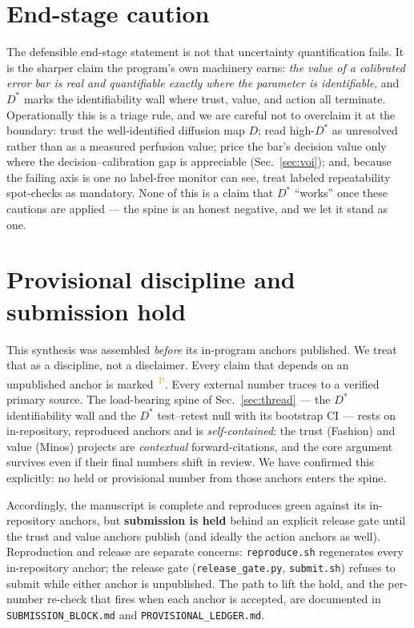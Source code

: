 \documentclass[11pt]{article}
\newcommand{\Dstar}{D^{*}}
\newcommand{\PROV}{\textsuperscript{\textcolor{orange}{\,P}}}
\begin{document}
\section{End-stage caution}\label{sec:caution}
The defensible end-stage statement is not that uncertainty quantification fails. It is the
sharper claim the program's own machinery earns: \emph{the value of a calibrated error bar is
real and quantifiable exactly where the parameter is identifiable}, and $\Dstar$ marks the
identifiability wall where trust, value, and action all terminate. Operationally this is a triage
rule, and we are careful not to overclaim it at the boundary: trust the well-identified diffusion
map $D$; read high-$\Dstar$ as unresolved rather than as a measured perfusion value; price the
bar's decision value only where the decision--calibration gap is appreciable
(Sec.~\ref{sec:voi}); and, because the failing axis is one no label-free monitor can see, treat
labeled repeatability spot-checks as mandatory. None of this is a claim that $\Dstar$ ``works''
once these cautions are applied --- the spine is an honest negative, and we let it stand as one.

\section{Provisional discipline and submission hold}\label{sec:hold}
This synthesis was assembled \emph{before} its in-program anchors published. We treat that as a
discipline, not a disclaimer. Every claim that depends on an unpublished anchor is marked \PROV{}.
Every external number traces to a verified primary source. The load-bearing spine of
Sec.~\ref{sec:thread} --- the $\Dstar$ identifiability wall and the $\Dstar$ test--retest null
with its bootstrap CI --- rests on in-repository, reproduced anchors and is \emph{self-contained}:
the trust (Fashion) and value (Minos) projects are \emph{contextual} forward-citations, and the
core argument survives even if their final numbers shift in review. We have confirmed this
explicitly: no held or provisional number from those anchors enters the spine.

Accordingly, the manuscript is complete and reproduces green against its in-repository anchors,
but \textbf{submission is held} behind an explicit release gate until the trust and value anchors
publish (and ideally the action anchors as well). Reproduction and release are separate concerns:
\texttt{reproduce.sh} regenerates every in-repository anchor; the release gate
(\texttt{release\_gate.py}, \texttt{submit.sh}) refuses to submit while either anchor is
unpublished. The path to lift the hold, and the per-number re-check that fires when each anchor is
accepted, are documented in \texttt{SUBMISSION\_BLOCK.md} and \texttt{PROVISIONAL\_LEDGER.md}.
\end{document}
